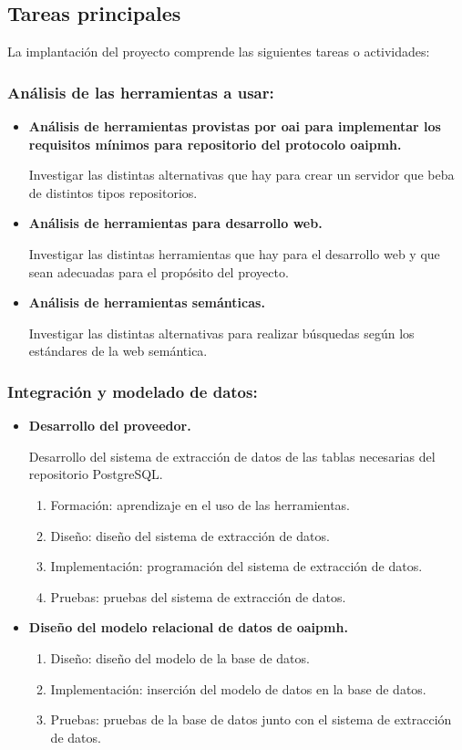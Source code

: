 \subsection{Tareas principales}

La implantación del proyecto comprende las siguientes tareas o actividades: 

\subsubsection{Análisis de las herramientas a usar:}

\begin{itemize}
	\item \textbf{Análisis de herramientas provistas por \acrshort{oai} para implementar los requisitos mínimos para repositorio del protocolo \acrshort{oaipmh}.}

	Investigar las distintas alternativas que hay para crear un servidor que beba de distintos tipos repositorios.
	\item \textbf{Análisis de herramientas para desarrollo web.}

	Investigar las distintas herramientas que hay para el desarrollo web y que sean adecuadas para el propósito del proyecto.
	\item \textbf{Análisis de herramientas semánticas.}

	Investigar las distintas alternativas para realizar búsquedas según los estándares de la web semántica. 
\end{itemize}

\subsubsection{Integración y modelado de datos:}

\begin{itemize}
	\item \textbf{Desarrollo del proveedor.}
	
	Desarrollo del sistema de extracción de datos de las tablas necesarias del repositorio PostgreSQL.

	\begin{enumerate}
		\item Formación: aprendizaje en el uso de las herramientas.
		\item Diseño: diseño del sistema de extracción de datos.
		\item Implementación: programación del sistema de extracción de datos.
		\item Pruebas: pruebas del sistema de extracción de datos.
	\end{enumerate}
	\item \textbf{Diseño del modelo relacional de datos de \acrshort{oaipmh}.}
	\begin{enumerate}
		\item Diseño: diseño del modelo de la base de datos. 
		\item Implementación: inserción del modelo de datos en la base de datos.
		\item Pruebas: pruebas de la base de datos junto con el sistema de extracción de datos.
	\end{enumerate}
\end{itemize}

